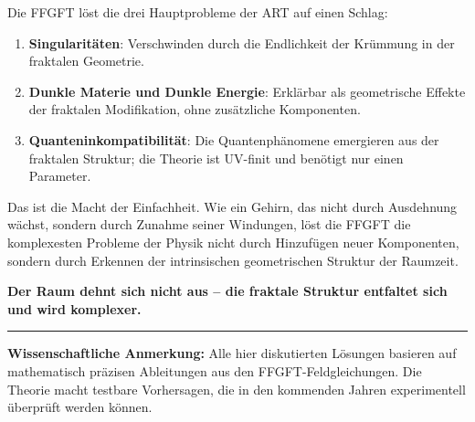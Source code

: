 Die FFGFT löst die drei Hauptprobleme der ART auf einen Schlag:

\begin{enumerate}[leftmargin=*]
\item \textbf{Singularitäten}: Verschwinden durch die Endlichkeit der Krümmung in der fraktalen Geometrie.
\item \textbf{Dunkle Materie und Dunkle Energie}: Erklärbar als geometrische Effekte der fraktalen Modifikation, ohne zusätzliche Komponenten.
\item \textbf{Quanteninkompatibilität}: Die Quantenphänomene emergieren aus der fraktalen Struktur; die Theorie ist UV-finit und benötigt nur einen Parameter.
\end{enumerate}

Das ist die Macht der Einfachheit. Wie ein Gehirn, das nicht durch Ausdehnung wächst, sondern durch Zunahme seiner Windungen, löst die FFGFT die komplexesten Probleme der Physik nicht durch Hinzufügen neuer Komponenten, sondern durch Erkennen der intrinsischen geometrischen Struktur der Raumzeit.

\textbf{Der Raum dehnt sich nicht aus – die fraktale Struktur entfaltet sich und wird komplexer.}

\vspace{1cm}
\hrule
\vspace{0.5cm}
\noindent\textbf{Wissenschaftliche Anmerkung:} Alle hier diskutierten Lösungen basieren auf mathematisch präzisen Ableitungen aus den FFGFT-Feldgleichungen. Die Theorie macht testbare Vorhersagen, die in den kommenden Jahren experimentell überprüft werden können.



